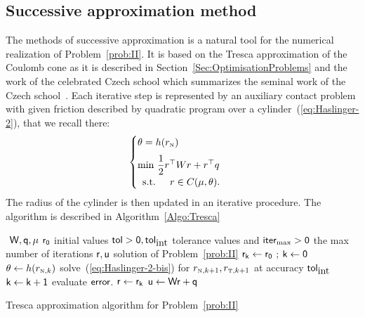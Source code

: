 \subsection{Successive approximation  method}
\label{Sec:Tresca-solver}
The methods of successive approximation is a natural tool for the numerical realization of Problem~\ref{prob:II}. It is based on the Tresca approximation of the Coulomb cone as it is described in Section~\ref{Sec:OptimisationProblems} and the work of the celebrated Czech school which summarizes the seminal work of the Czech school~\cite{Necas.ea1980,Haslinger1983,Haslinger1984,Haslinger.ea1996}.   Each iterative step is represented by an auxiliary contact problem with given friction described by quadratic program over a cylinder~(\ref{eq:Haslinger-2}), that we recall there:
\begin{equation}
  \label{eq:Haslinger-2-bis}
  \begin{cases}
    \theta = h(r_\n) \\[2mm]
    \min\, \Frac 1 2 r^\top W r + r^\top q \\
    \begin{array}{ll}
    \text{s.t. }& r \in C(\mu,\theta).
  \end{array}
  \end{cases}
\end{equation}
The radius of the cylinder is then updated in an iterative procedure.  The algorithm is described in Algorithm~\ref{Algo:Tresca}
\begin{algorithm}
  \begin{algorithmic}
    {\sf
      \STATE $ $ 
      \REQUIRE $\sf W,q,\mu$
      \REQUIRE $\sf r_0$ initial values
      \REQUIRE $\sf tol >0, tol_{\mbox{int}}$  tolerance values and $\sf iter_{\max}  >0$ the max number of iterations
      \ENSURE  $\sf r,u$ solution of Problem~\ref{prob:II}
      \STATE $\sf r_{k} \leftarrow r_0 $ ; $\sf k \leftarrow 0$ 
      \STATE $\theta \leftarrow h(r_{{\hbox{\tiny{N}}},k})$ 
      \STATE solve~(\ref{eq:Haslinger-2-bis}) for $r_{{\hbox{\tiny{N}}},k+1},r_{{\hbox{\tiny{T}}},k+1}$ at accuracy $\sf tol_{\mbox{int}}$
      \STATE $\sf k \leftarrow k+1$
      \STATE evaluate $\sf error$.
      \ENDWHILE
      \STATE $\sf r \leftarrow r_{k}$ 
      \STATE $\sf u \leftarrow W r + q$ 
    }
  \end{algorithmic}
  \caption{Tresca approximation algorithm for Problem~\ref{prob:II}}
  \label{Algo:Tresca}
\end{algorithm}

